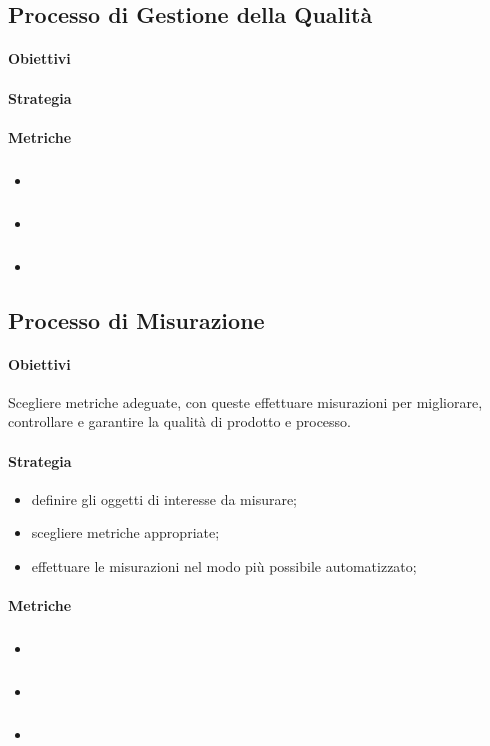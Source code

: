 	\subsection{Processo di Gestione della Qualità}
		\paragraph{Obiettivi}
		\paragraph{Strategia}
		\paragraph{Metriche}
			\subparagraph{} 
			\begin{itemize}
				\item \textbf{}
				\item \textbf{}
				\item \textbf{}
			\end{itemize}
	\subsection{Processo di Misurazione} %
		\paragraph{Obiettivi}
		Scegliere metriche adeguate, con queste effettuare misurazioni per migliorare, controllare e garantire la qualità di prodotto e processo.
		\paragraph{Strategia}
		\begin{itemize}
			\item definire gli oggetti di interesse da misurare;
			\item scegliere metriche appropriate;
			\item effettuare le misurazioni nel modo più possibile automatizzato;
		\end{itemize}
		\paragraph{Metriche}
			\subparagraph{} 
			\begin{itemize}
				\item \textbf{}
				\item \textbf{}
				\item \textbf{}
			\end{itemize}
		
